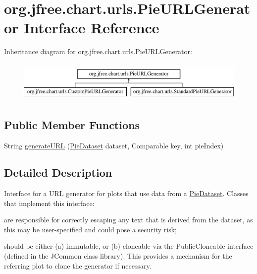 \hypertarget{interfaceorg_1_1jfree_1_1chart_1_1urls_1_1_pie_u_r_l_generator}{}\section{org.\+jfree.\+chart.\+urls.\+Pie\+U\+R\+L\+Generator Interface Reference}
\label{interfaceorg_1_1jfree_1_1chart_1_1urls_1_1_pie_u_r_l_generator}
Inheritance diagram for org.\+jfree.\+chart.\+urls.\+Pie\+U\+R\+L\+Generator\+:\begin{figure}[H]
\begin{center}
\leavevmode
\includegraphics[height=2.000000cm]{interfaceorg_1_1jfree_1_1chart_1_1urls_1_1_pie_u_r_l_generator}
\end{center}
\end{figure}
\subsection*{Public Member Functions}
\begin{DoxyCompactItemize}
\item 
String \mbox{\hyperlink{interfaceorg_1_1jfree_1_1chart_1_1urls_1_1_pie_u_r_l_generator_a12308fce0c3989b6483a2f67c9f88b4d}{generate\+U\+RL}} (\mbox{\hyperlink{interfaceorg_1_1jfree_1_1data_1_1general_1_1_pie_dataset}{Pie\+Dataset}} dataset, Comparable key, int pie\+Index)
\end{DoxyCompactItemize}


\subsection{Detailed Description}
Interface for a U\+RL generator for plots that use data from a \mbox{\hyperlink{}{Pie\+Dataset}}. Classes that implement this interface\+: 
\begin{DoxyItemize}
\item are responsible for correctly escaping any text that is derived from the dataset, as this may be user-\/specified and could pose a security risk; 
\item should be either (a) immutable, or (b) cloneable via the {\ttfamily Public\+Cloneable} interface (defined in the J\+Common class library). This provides a mechanism for the referring plot to clone the generator if necessary. 
\end{DoxyItemize}

